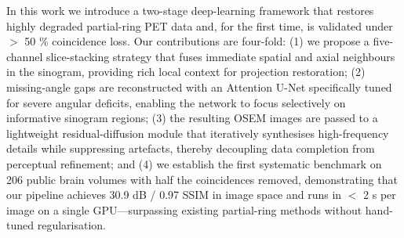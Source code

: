 \documentclass[12pt]{iopart}
\begin{document}

In this work we introduce a two-stage deep-learning framework that restores highly degraded partial-ring PET data and, for the first time, is validated under $>$ 50 \% coincidence loss.  Our contributions are four-fold: 
(1) we propose a five-channel slice-stacking strategy that fuses immediate spatial and axial neighbours in the sinogram, providing rich local context for projection restoration; 
(2) missing‐angle gaps are reconstructed with an Attention U-Net specifically tuned for severe angular deficits, enabling the network to focus selectively on informative sinogram regions; 
(3) the resulting OSEM images are passed to a lightweight residual-diffusion module that iteratively synthesises high-frequency details while suppressing artefacts, thereby decoupling data completion from perceptual refinement; 
and (4) we establish the first systematic benchmark on 206 public brain volumes with half the coincidences removed, demonstrating that our pipeline achieves 30.9 dB / 0.97 SSIM in image space and runs in $<$ 2 s per image on a single GPU—surpassing existing partial-ring methods without hand-tuned regularisation.

\end{document}
